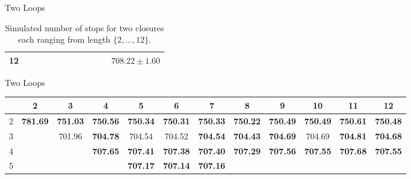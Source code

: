 \documentclass[hyphens,aspectratio=169]{beamer}
\begin{document}
\begin{frame}[fragile]{Two Loops}
\begin{table}[H]
\begin{adjustbox}{max width=\textwidth}
\begin{tabular}{|c|c|c|c|c|c|c|c|c|c|c|c|}
				\hline
				12                &                   &                   &                   &                   &                   &                   &                   &                   &                   &                   & $708.22 \pm 1.60$ \\
				\hline
			\end{tabular}
		\end{adjustbox}
		\caption{Simulated number of stops for two closures each ranging
			from length $\{2,\dots,12\}$.}
	\end{table}

\end{frame}

\begin{frame}[fragile]{Two Loops}
	\begin{table}[H]
		\centering
		\begin{adjustbox}{max width=\textwidth,max height=2\textheight}
			\begin{tabular}{|c|c|c|c|c|c|c|c|c|c|c|c|}
				\hline
				                & 2               & 3               & 4               & 5               & 6               & 7               & 8               & 9               & 10              & 11              & 12              \\
				\hline
				2               & \textbf{781.69} & \textbf{751.03} & \textbf{750.56} &
				\textbf{750.34} & \textbf{750.31} & \textbf{750.33} &
				\textbf{750.22} & \textbf{750.49} & \textbf{750.49} &
				\textbf{750.61} & \textbf{750.48}                                                                                                                                                                                     \\
				\hline
				3               &                 & 701.96          & \textbf{704.78} & 704.54          & 704.52          & \textbf{704.54} & \textbf{704.43} & \textbf{704.69} & 704.69          & \textbf{704.81} & \textbf{704.68} \\
				\hline
				4               &                 &                 & \textbf{707.65} & \textbf{707.41} & \textbf{707.38} &
				\textbf{707.40} & \textbf{707.29} & \textbf{707.56} &
				\textbf{707.55} & \textbf{707.68} & \textbf{707.55}                                                                                                                                                                   \\
				\hline
				5               &                 &                 &                 & \textbf{707.17} & \textbf{707.14} & \textbf{707.16} &

\end{tabular}
\end{adjustbox}
\end{table}
\end{frame}
\end{document}
